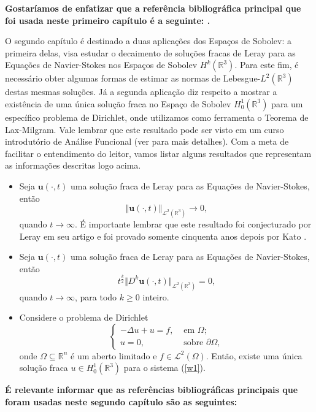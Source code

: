 \textbf{Gostaríamos de enfatizar que a referência bibliográfica principal que foi usada neste primeiro capítulo é a seguinte: \cite{evans-pde}.}

O segundo capítulo é destinado a duas aplicações dos Espaços de Sobolev:
a primeira delas, visa estudar o decaimento de soluções fracas  de Leray para as Equações de Navier-Stokes nos Espaços de Sobolev $H^k(\mathbb{R}^3)$. Para este fim, é necessário obter algumas formas de estimar as normas de Lebesgue-$L^2(\mathbb{R}^3)$ destas mesmas soluções. Já a segunda aplicação diz respeito a mostrar a existência de uma única solução fraca no Espaço de Sobolev $H^1_0(\mathbb{R}^3)$ para um específico problema de Dirichlet, onde utilizamos como ferramenta o Teorema de Lax-Milgram. Vale lembrar que este resultado pode ser visto em um curso introdutório de Análise Funcional  (ver \cite{kreyszig-functional.analysis} para mais detalhes). Com a meta de facilitar o entendimento do leitor, vamos listar alguns resultados que representam as informações descritas logo acima.
\begin{itemize}[label={\small$\bullet$}]
\item Seja $\mathbf{u}(\cdot,t)$ uma solução fraca de Leray para as Equações de Navier-Stokes, então
    \[
        \Vert \mathbf{u}(\cdot,t) \Vert_{\mathcal{L}^2(\mathbb{R}^3)} \to 0,
    \]
    quando $t \to \infty$.
    É importante lembrar que este resultado foi conjecturado por Leray em seu artigo \cite{leray-fluid} e foi provado somente cinquenta anos depois por Kato \cite{kato-navier.stokes}.
\item Seja $\mathbf{u}(\cdot,t)$ uma solução fraca de Leray para as Equações de Navier-Stokes, então
    \[
        t^{\frac{k}{2}} \Vert D^k\mathbf{u}(\cdot,t) \Vert_{\mathcal{L}^2(\mathbb{R}^3)} = 0,
    \]
    quando $t \to \infty$,
    para todo $k \geq 0$ inteiro.
\item Considere o problema de Dirichlet
\begin{equation}\label{w1}
    \left\{
    \begin{aligned}
        -\Delta u + u = f, &\text{ em } \Omega;\\
        u = 0, &\text{ sobre } \partial\Omega,
    \end{aligned}
    \right.
\end{equation}
onde $\Omega \subseteq \mathbb{R}^n$ é um aberto limitado e $f \in \mathcal{L}^2(\Omega)$. Então,
existe uma única solução fraca $u\in H_0^1(\mathbb{R}^3)$ para o sistema (\ref{w1}).
\end{itemize}
\textbf{É relevante informar que as referências bibliográficas principais que foram usadas neste segundo capítulo são as seguintes: \cite{kreyszig-functional.analysis,zingano-edp}}


